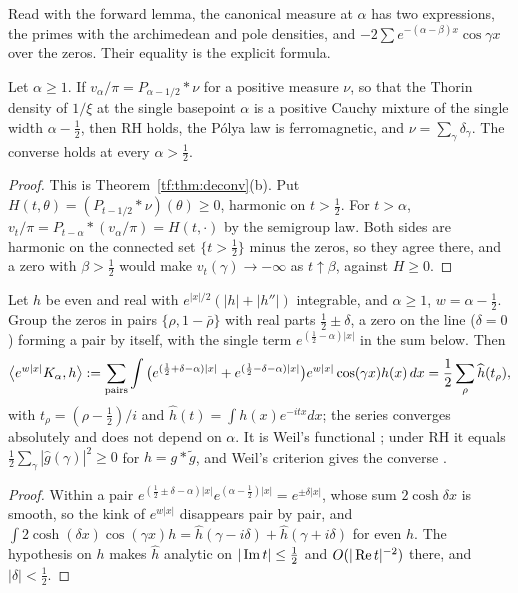 Read with the forward lemma, the canonical measure at $\alpha$ has two expressions, the primes with the archimedean and pole densities, and $-2\sum e^{-(\alpha-\beta)x}\cos\gamma x$ over the zeros. Their equality is the explicit formula.

\begin{theorem}\label{cm:thm:single}
Let $\alpha\ge1$. If $v_\alpha/\pi=P_{\alpha-1/2}*\nu$ for a positive measure $\nu$, so that the Thorin density of $1/\xi$ at the single basepoint $\alpha$ is a positive Cauchy mixture of the single width $\alpha-\frac12$, then RH holds, the P\'olya law is ferromagnetic, and $\nu=\sum_\gamma\delta_\gamma$. The converse holds at every $\alpha>\frac12$.
\end{theorem}

\begin{proof}
This is Theorem~\ref{tf:thm:deconv}(b). Put $H(t,\theta)=(P_{t-1/2}*\nu)(\theta)\ge0$, harmonic on $t>\frac12$. For $t>\alpha$, $v_t/\pi=P_{t-\alpha}*(v_\alpha/\pi)=H(t,\cdot)$ by the semigroup law. Both sides are harmonic on the connected set $\{t>\frac12\}$ minus the zeros, so they agree there, and a zero with $\beta>\frac12$ would make $v_t(\gamma)\to-\infty$ as $t\uparrow\beta$, against $H\ge0$.
\end{proof}

\begin{theorem}\label{cm:thm:weil}
Let $h$ be even and real with $e^{|x|/2}(|h|+|h''|)$ integrable, and $\alpha\ge1$, $w=\alpha-\frac12$. Group the zeros in pairs $\{\rho,1-\bar\rho\}$ with real parts $\frac12\pm\delta$, a zero on the line ($\delta=0$) forming a pair by itself, with the single term $e^{(\frac12-\alpha)|x|}$ in the sum below. Then
\[
\big\langle e^{w|x|}K_\alpha,h\big\rangle:=\sum_{\rm pairs}\int\big(e^{(\frac12+\delta-\alpha)|x|}+e^{(\frac12-\delta-\alpha)|x|}\big)e^{w|x|}\cos(\gamma x)h(x)\,dx=\frac12\sum_\rho\widehat h(t_\rho),
\]
with $t_\rho=(\rho-\frac12)/i$ and $\widehat h(t)=\int h(x)e^{-itx}dx$; the series converges absolutely and does not depend on $\alpha$. It is Weil's functional \cite{Weil52}; under RH it equals $\frac12\sum_\gamma|\widehat g(\gamma)|^2\ge0$ for $h=g*\tilde g$, and Weil's criterion gives the converse \cite{Weil52,Bombieri}.
\end{theorem}

\begin{proof}
Within a pair $e^{(\frac12\pm\delta-\alpha)|x|}e^{(\alpha-\frac12)|x|}=e^{\pm\delta|x|}$, whose sum $2\cosh\delta x$ is smooth, so the kink of $e^{w|x|}$ disappears pair by pair, and $\int2\cosh(\delta x)\cos(\gamma x)h=\widehat h(\gamma-i\delta)+\widehat h(\gamma+i\delta)$ for even $h$. The hypothesis on $h$ makes $\widehat h$ analytic on $|\operatorname{Im} t|\le\frac12$ and $O(|\operatorname{Re} t|^{-2})$ there, and $|\delta|<\frac12$.
\end{proof}

